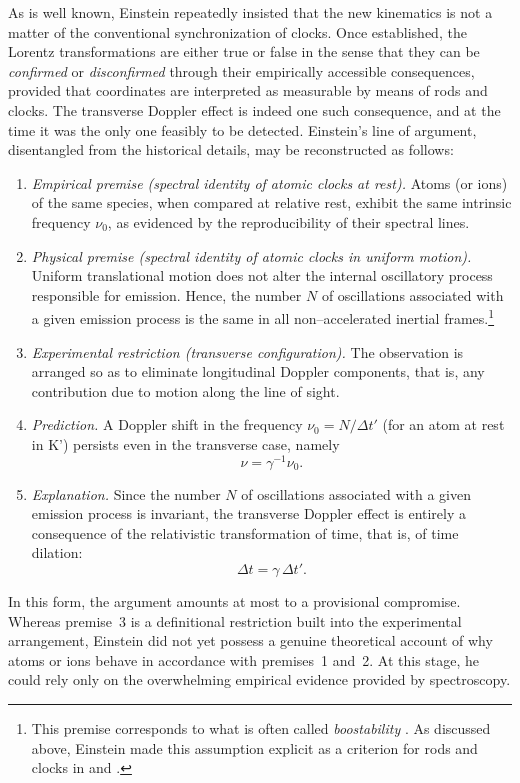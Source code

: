 \documentclass[pdflatex,sn-basic]{sn-jnl}
\newcommand{\tDe}{transverse Doppler effect\xspace}
\begin{document}
As is well known, Einstein repeatedly insisted that the new kinematics is not a matter of the conventional synchronization of clocks. Once established, the Lorentz transformations are either true or false in the sense that they can be \emph{confirmed} or \emph{disconfirmed} through their empirically accessible consequences, provided that coordinates are interpreted as measurable by means of  rods and clocks. The \tDe is indeed one such consequence, and at the time it was the only one feasibly to be detected. Einstein’s line of argument, disentangled from the historical details, may be reconstructed as follows:
%
\begin{enumerate}
\item \emph{Empirical premise (spectral identity of atomic clocks at rest).}  
Atoms (or ions) of the same species, when compared at relative rest, exhibit the same intrinsic frequency $\nu_0$, as evidenced by the reproducibility of their spectral lines.

\item \emph{Physical premise (spectral identity of atomic clocks in uniform motion).}  
Uniform translational motion does not alter the internal oscillatory process responsible for emission. Hence, the number $N$ of oscillations associated with a given emission process is the same in all non--accelerated inertial frames.\footnote{This premise corresponds to what is often called \emph{boostability} \citep[30, 81, 121]{Brown2005}. As discussed above, Einstein made this assumption explicit as a criterion for  rods and clocks in \cite[420]{Einstein1908} and \cite[126][]{Einstein1910}.}

\item \emph{Experimental restriction (transverse configuration).}  
The observation is arranged so as to eliminate longitudinal Doppler components, that is, any contribution due to motion along the line of sight.

\item \emph{Prediction.}  
A Doppler shift in the frequency $\nu_0=N/\Delta t'$ (for an atom at rest in K') persists even in the transverse case, namely
\[
\nu = \gamma^{-1}\nu_0 .
\]

\item \emph{Explanation.}  
Since the number $N$ of oscillations associated with a given emission process is invariant, the \tDe is entirely a consequence of the relativistic transformation of time, that is, of time dilation:
\[
\Delta t = \gamma\,\Delta t'.
\]
\end{enumerate}%
%
In this form, the argument amounts at most to a provisional compromise. Whereas premise~3 is a definitional restriction built into the experimental arrangement, Einstein did not yet possess a genuine theoretical account of why atoms or ions behave in accordance with premises~1 and~2. At this stage, he could rely only on the overwhelming empirical evidence provided by spectroscopy.
\end{document}
